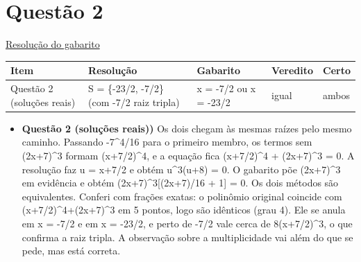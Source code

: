 \documentclass{article}%
\begin{document}
\section*{Questão 2}%
\href{https://poliedroresolve.sistemapoliedro.com.br/vestibulares/ime/2026/ime-2-fase-dia-1-23-10-2025-2-fase-dia-1/dissertativa-2-matematica-2-fase-dia-1-ime-2026}{Resolução do gabarito}\par\smallskip%
\begin{longtable}{@{}p{} p{} p{} p{} p{}@{}}\toprule Item & Resolução & Gabarito & Veredito & Certo \\ \midrule
Questão 2 (soluções reais) & S = \{{-}23/2, {-}7/2\} (com {-}7/2 raiz tripla) & x = {-}7/2 ou x = {-}23/2 & igual & ambos \\
\bottomrule\end{longtable}%
\begin{itemize}%
\item%
\textbf{Questão 2 (soluções reais))} Os dois chegam às mesmas raízes pelo mesmo caminho. Passando {-}7\^{}4/16 para o primeiro membro, os termos sem (2x+7)\^{}3 formam (x+7/2)\^{}4, e a equação fica (x+7/2)\^{}4 + (2x+7)\^{}3 = 0. A resolução faz u = x+7/2 e obtém u\^{}3(u+8) = 0. O gabarito põe (2x+7)\^{}3 em evidência e obtém (2x+7)\^{}3{[}(2x+7)/16 + 1{]} = 0. Os dois métodos são equivalentes. Conferi com frações exatas: o polinômio original coincide com (x+7/2)\^{}4+(2x+7)\^{}3 em 5 pontos, logo são idênticos (grau 4). Ele se anula em x = {-}7/2 e em x = {-}23/2, e perto de {-}7/2 vale cerca de 8(x+7/2)\^{}3, o que confirma a raiz tripla. A observação sobre a multiplicidade vai além do que se pede, mas está correta.%
\end{itemize}%
\end{document}
